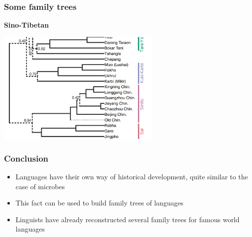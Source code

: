 \documentclass{beamer}
\begin{document}
\begin{frame}
\frametitle{Some family trees}

\textbf{Sino-Tibetan} 

\begin{center}
    \includegraphics[width=0.6\textwidth]{history-trees/sino-tibetan-1.PNG}
\end{center}

\end{frame}

\begin{frame}
\frametitle{Conclusion}

\begin{itemize}
    \item Languages have their own way of historical development,
    quite similar to the case of microbes
    \item This fact can be used to build family trees of languages
    \item Linguists have already reconstructed several family trees for famous world languages
\end{itemize}    

\end{frame}
\end{document}
